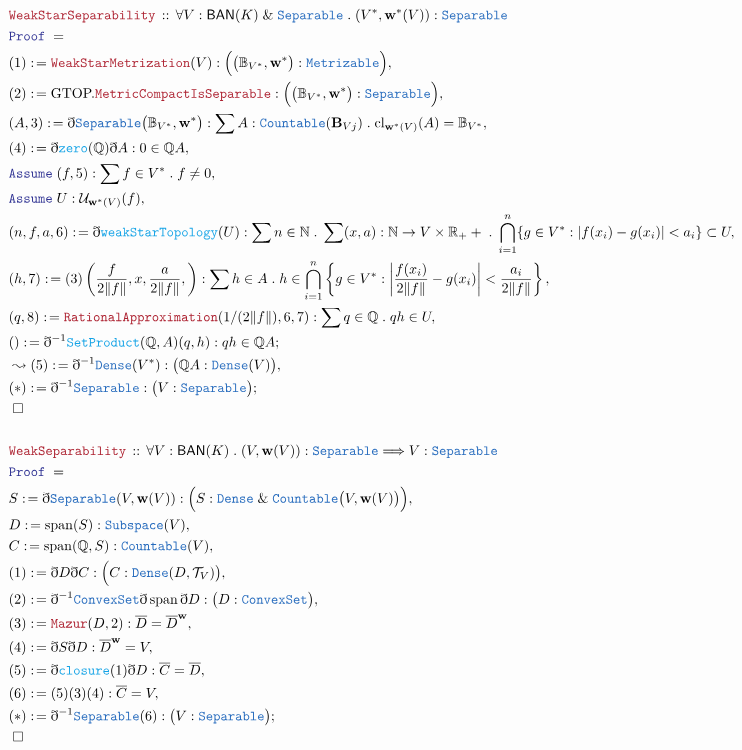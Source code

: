 \documentclass[12pt]{scrartcl}
\newcommand{\TYPE}[1]{\textcolor{NavyBlue}{\mathtt{#1}}}
\newcommand{\FUNC}[1]{\textcolor{Cerulean}{\mathtt{#1}}}
\newcommand{\LOGIC}[1]{\textcolor{Blue}{\mathtt{#1}}}
\newcommand{\THM}[1]{\textcolor{Maroon}{\mathtt{#1}}}
\renewcommand{\.}{\; . \;}
\newcommand{\de}{: \kern 0.1pc =}
\newcommand{\Theorem}[2]{& \THM{#1} \, :: \, #2 \\ & \Proof = \\ }
\newcommand{\Page}[1]{\begin{align*} #1 \end{align*} \newpage   }
\newcommand{ \bd }{ \ByDef }
\renewcommand{\And}{\; \& \;}
\newcommand{\Reals}{\mathbb{R} }
\newcommand{\Rats}{\mathbb{Q} }
\newcommand{\Nat}{\mathbb{N} }
\newcommand{\Say}[3]{& #1 \de #2 : #3, \\}
\newcommand{\Conclude}[3]{& #1 \de #2 : #3; \\}
\newcommand{\Derive}[3]{& \leadsto #1 \de #2 : #3, \\}
\newcommand{\A}{\LOGIC{Assume} \;}
\newcommand{\Assume}[2]{& \A #1 : #2, \\}
\newcommand{\QED}{\; \square}
\newcommand{\EndProof}{& \QED \\}
\newcommand{\ByDef}{\eth}
\newcommand{\Proof}{\LOGIC{Proof} \; }
\DeclareMathOperator{\Span}{span}
\newcommand{\Sep}{\TYPE{Separable}}
\newcommand{\BAN}{\textsf{BAN}}
\begin{document}
\Page{
\Theorem{WeakStarSeparability}{\forall V : \BAN(K) \And \Sep \. (V^*,\mathbf{w}^*(V)) : \Sep }
\Say{ (1) }{ \THM{WeakStarMetrization}(V)}{ \Big( \big( \mathbb{B}_{V^*}, \mathbf{w^*} \big) : \TYPE{Metrizable}   \Big)}
\Say{ (2) }{ \textrm{GTOP.}\THM{MetricCompactIsSeparable}}{ \Big( \big( \mathbb{B}_{V^*}, \mathbf{w^*} \big) : \TYPE{Separable}   \Big)}
\Say{(A,3)}{ \bd \TYPE{Separable}\big( \mathbb{B}_{V^*}, \mathbf{w^*} \big)  }{ \sum A : \TYPE{Countable}(\mathbf{B}_{V^^*}) \. 
\mathrm{cl}_{\mathbf{w}^*(V)}(A) = \mathbb{B}_{V^*}  }
\Say{(4)}{ \bd \FUNC{zero}(\Rats) \bd A }{0 \in \Rats A }
\Assume{ (f,5) }{\sum f \in V^* \. f \neq 0}
\Assume{U}{ \mathcal{U}_{\mathbf{w}^*(V)}(f) }
\Say{(n,f,a,6)}{ \bd\FUNC{weakStarTopology}(U) }{ \sum n \in \Nat \.  \sum (x,a) : \Nat \to V \times \Reals_++ \. \bigcap^n_{i = 1} \{ g \in V^* : | f(x_i) -g(x_i) | < a_i    \} \subset U }
\Say{(h,7)}{ (3)\left( \frac{f}{2\|f\|}, x, \frac{a}{2\|f\|}, \right) }{ \sum h \in A \. h \in \bigcap^n_{i = 1} \left\{ g \in V^* : \left| \frac{f(x_i)}{2\|f\|} - g(x_i) \right| < \frac{a_i}{2\|f\|} \right\}}
\Say{(q,8)}{\THM{RationalApproximation}(1/(2\|f\|),6,7)}{\sum q \in \Rats \. qh \in U}
\Conclude{()}{ \bd^{-1} \FUNC{SetProduct}(\Rats,A)( q,h )  }{qh \in \Rats A}
\Derive{(5) }{ \bd^{-1} \TYPE{Dense}(V^*) }{ \big(\Rats A : \TYPE{Dense}(V) \big)}
\Conclude{(*)}{ \bd^{-1} \TYPE{Separable} }{ \big( V : \TYPE{Separable} \big) }
\EndProof
\\
\Theorem{WeakSeparability}{\forall V : \BAN(K) \. (V,\mathbf{w}(V)) : \Sep \Longrightarrow V : \Sep }
\Say{S}{ \bd \Sep (V,\mathbf{w}(V))  }{ \Big( S : \TYPE{Dense} \And \TYPE{Countable}\big(V,\mathbf{w}(V)\big) \Big) }
\Say{D}{\Span(S)}{ \TYPE{Subspace}(V)}
\Say{C}{\Span(\Rats,S)}{\TYPE{Countable}(V)}
\Say{(1)}{\bd D \bd C }{ \Big(  C : \TYPE{Dense}(D,\mathcal{T}_V) \big)}
\Say{(2)}{ \bd^{-1} \TYPE{ConvexSet} \bd \Span  \bd D }{\big(D : \TYPE{ConvexSet}\big) }
\Say{(3)}{\THM{Mazur}(D,2)}{ \overline{D} = \overline{D}^{\mathbf{w}}  }
\Say{(4)}{ \bd S \bd D }{ \overline{D}^{\mathbf{w}} = V }
\Say{(5)}{ \bd \FUNC{closure}(1) \bd D  }{\overline{C} = \overline{D}}
\Say{(6)}{(5)(3)(4)}{\overline{C} = V}
\Conclude{(*)}{\bd^{-1} \Sep (6)}{\big(V : \Sep \big)}
\EndProof
}
\end{document}
